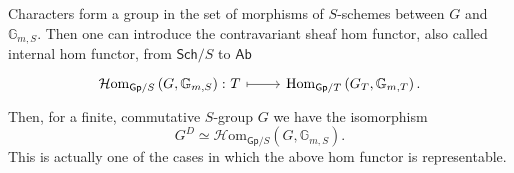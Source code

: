 \begin{rem}\label{rem:DualasHomFct}
	Characters form a group in the set of morphisms of $S$-schemes
	between $G$ and $\mathbb{G}_{m,S}$.
	Then one can introduce the contravariant sheaf hom functor, also called
	internal hom functor, from $\mathsf{Sch}/S$ to $\mathsf{Ab}$
	\begin{equation*}
	\begin{tikzcd}[row sep = 0ex
		,/tikz/column 1/.append style={anchor=base east}
		,/tikz/column 2/.append style={anchor=base west}]
		\mathcal{H}\mathrm{om}_{\mathsf{Gp}/S} \left( G, \mathbb{G}_{m,S} \right)\colon
		T \arrow[r, "", mapsto] & 
		\Hom_{\mathsf{Gp}/T} \left( G_T, \mathbb{G}_{m,T} \right)
	.\end{tikzcd}
	\end{equation*} 
	Then, for a finite, commutative $S$-group $G$ we have the isomorphism
	\begin{equation*}
		G^D \simeq \mathcal{H}\mathrm{om}_{\mathsf{Gp}/S} \left( G, \mathbb{G}_{m,S} \right)
	.\end{equation*} 
	This is actually one of the cases in which the above hom functor
	is representable.
\end{rem}


